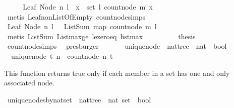 \begin{isabellebody}
%
\isadelimproof
%
\endisadelimproof
%
\isatagproof
{}\isamarkupfalse%
\ {\isacharminus}\isanewline
\ \ \isamarkupfalse%
\ {\isachardoublequoteopen}Leaf\ {\isacharparenleft}Node\ n\ l{\isacharparenright}\ {\isasymlongrightarrow}\ {\isacharparenleft}{\isasymforall}x\ {\isasymin}\ set\ l{\isachardot}\ count{\isacharunderscore}node\ m\ x\ {\isacharequal}\ {}{\isacharparenright}{\isachardoublequoteclose}\isanewline
\ \ \ \ \isamarkupfalse%
\ {\isacharparenleft}metis\ Leaf{\isacharunderscore}non{\isacharunderscore}ListOfEmpty\ count{\isacharunderscore}node{\isachardot}simps{\isacharparenleft}{}{\isacharparenright}{\isacharparenright}\ \isanewline
\ \ \isamarkupfalse%
\ \isamarkupfalse%
\ {\isachardoublequoteopen}Leaf\ {\isacharparenleft}Node\ n\ l{\isacharparenright}\ {\isasymlongrightarrow}\ \ ListSum\ {\isacharparenleft}map\ {\isacharparenleft}count{\isacharunderscore}node\ m{\isacharparenright}\ l{\isacharparenright}\ {\isacharequal}\ {}{\isachardoublequoteclose}\isanewline
\ \ \ \ \isamarkupfalse%
\ {\isacharparenleft}metis\ ListSum{\isacharunderscore}{}\ Listmax{\isacharunderscore}ge\ le{\isacharunderscore}zero{\isacharunderscore}eq\ listmax{\isacharunderscore}{}{\isacharparenright}\ \ \ \ \isanewline
\ \ \isamarkupfalse%
\ \isamarkupfalse%
\ {\isacharquery}thesis\isanewline
\ \ \ \ \isamarkupfalse%
\ count{\isacharunderscore}node{\isachardot}simps{\isacharparenleft}{}{\isacharparenright}\ \isamarkupfalse%
\ presburger\ \isanewline
{}\isamarkupfalse%
%
\endisatagproof
{\isafoldproof}%
%
\isadelimproof
\isanewline
%
\endisadelimproof
\ \ \ \ \isanewline
{}\isamarkupfalse%
\ unique{\isacharunderscore}node\ {\isacharcolon}{\isacharcolon}\ {\isachardoublequoteopen}nattree\ {\isasymRightarrow}\ nat\ {\isasymRightarrow}\ bool{\isachardoublequoteclose}\ \isanewline
\ \ {\isachardoublequoteopen}unique{\isacharunderscore}node\ t\ n\ {\isacharequal}\ {\isacharparenleft}count{\isacharunderscore}node\ n\ t\ {\isacharequal}\ {}{\isacharparenright}{\isachardoublequoteclose}%
\begin{isamarkuptext}%
This function returns true only if each member in a set has one and only associated node.%
\end{isamarkuptext}\isamarkuptrue%
\isamarkupfalse%
\ unique{\isacharunderscore}nodes{\isacharunderscore}by{\isacharunderscore}nat{\isacharunderscore}set\ {\isacharcolon}{\isacharcolon}\ {\isachardoublequoteopen}nattree\ {\isasymRightarrow}\ nat\ set\ {\isasymRightarrow}\ bool{\isachardoublequoteclose}\ \isanewline

\end{isabellebody}
